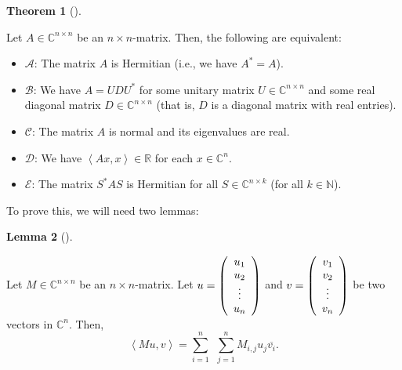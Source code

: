 \documentclass[numbers=enddot,12pt,final,onecolumn,notitlepage]{scrartcl}%
\numberwithin{exer}{subsection}
\theoremstyle{definition}
\newtheorem{theo}{Theorem}[subsection]
\newenvironment{theorem}[1][]
{\begin{theo}[#1]\begin{leftbar}}
{\end{leftbar}\end{theo}}
\newtheorem{lem}[theo]{Lemma}
\newenvironment{lemma}[1][]
{\begin{lem}[#1]\begin{leftbar}}
{\end{leftbar}\end{lem}}
\let\sumnonlimits\sum
\renewcommand{\sum}{\sumnonlimits\limits}
\begin{document}
\begin{theorem}
\label{thm.herm.ABCDE}Let $A\in\mathbb{C}^{n\times n}$ be an $n\times
n$-matrix. Then, the following are equivalent:

\begin{itemize}
\item $\mathcal{A}$: The matrix $A$ is Hermitian (i.e., we have $A^{\ast}=A$).

\item $\mathcal{B}$: We have $A=UDU^{\ast}$ for some unitary matrix
$U\in\mathbb{C}^{n\times n}$ and some real diagonal matrix $D\in
\mathbb{C}^{n\times n}$ (that is, $D$ is a diagonal matrix with real entries).

\item $\mathcal{C}$: The matrix $A$ is normal and its eigenvalues are real.

\item $\mathcal{D}$: We have $\left\langle Ax,x\right\rangle \in\mathbb{R}$
for each $x\in\mathbb{C}^{n}$.

\item $\mathcal{E}$: The matrix $S^{\ast}AS$ is Hermitian for all
$S\in\mathbb{C}^{n\times k}$ (for all $k\in\mathbb{N}$).
\end{itemize}
\end{theorem}

To prove this, we will need two lemmas:

\begin{lemma}
\label{lem.herm.Muv}Let $M\in\mathbb{C}^{n\times n}$ be an $n\times n$-matrix.
Let $u=\left(
\begin{array}
[c]{c}%
u_{1}\\
u_{2}\\
\vdots\\
u_{n}%
\end{array}
\right)  $ and $v=\left(
\begin{array}
[c]{c}%
v_{1}\\
v_{2}\\
\vdots\\
v_{n}%
\end{array}
\right)  $ be two vectors in $\mathbb{C}^{n}$. Then,%
\[
\left\langle Mu,v\right\rangle =\sum_{i=1}^{n}\ \ \sum_{j=1}^{n}M_{i,j}%
u_{j}\overline{v_{i}}.
\]

\end{lemma}
\end{document}
